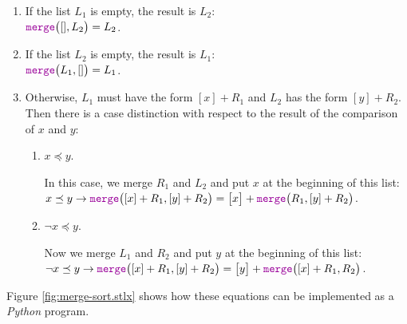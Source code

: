 \begin{enumerate}
\item If the list $L_1$ is empty, the result is $L_2$: \\[0.2cm]
      \hspace*{1.3cm} 
      $\mytt{merge}\bigl([], L_2\bigr) = L_2$.
\item If the list $L_2$  is empty, the result is $L_1$: \\[0.2cm]
      \hspace*{1.3cm} 
      $\mytt{merge}\bigl(L_1, []\bigr) = L_1$.
\item Otherwise, $L_1$ must have the form $[x] + R_1$ and $L_2$ has the form $[y] +R_2$.
      Then there is a case distinction with respect to the result of the comparison of $x$ and $y$:
      \begin{enumerate}
      \item $x \preceq y$.

            In this case, we merge $R_1$ and $L_2$ and put $x$ at the beginning of this list:
            \\[0.2cm]
            \hspace*{1.3cm} 
            $x \preceq y \rightarrow \mytt{merge}\bigl([x] + R_1, [y] + R_2\bigr) = \bigl[x\bigr] +
               \mytt{merge}\bigl(R_1,[y] + R_2\bigr)$.
      \item $\neg x \preceq y$.

            Now we merge $L_1$ and $R_2$ and put $y$ at the beginning of this list:
            \\[0.2cm]
            \hspace*{1.3cm} 
            $\neg x \preceq y \rightarrow \mytt{merge}\bigl([x] + R_1, [y] + R_2\bigr) = \bigl[y \bigr] +
             \mytt{merge}\bigl([x] + R_1,R_2\bigr)$.
      \end{enumerate}
\end{enumerate}

Figure \ref{fig:merge-sort.stlx} shows how these equations can be implemented as a \textsl{Python}
program.  

